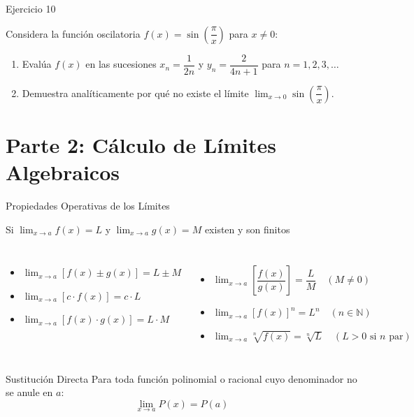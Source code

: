 \documentclass[aspectratio=169]{beamer}
\begin{document}
\begin{frame}{Ejercicio 10}
  \begin{mwejercicio}
    Considera la función oscilatoria $f(x) = \sin\left(\dfrac{\pi}{x}\right)$ para $x \neq 0$:
    \begin{enumerate}
      \item Evalúa $f(x)$ en las sucesiones $x_n = \dfrac{1}{2n}$ y $y_n = \dfrac{2}{4n + 1}$ para $n = 1, 2, 3, \dots$
      \item Demuestra analíticamente por qué no existe el límite $\lim_{x \to 0} \sin\left(\dfrac{\pi}{x}\right)$.
    \end{enumerate}
  \end{mwejercicio}
  \vspace{2.5cm}
\end{frame}


\section{Parte 2: Cálculo de Límites Algebraicos}


\begin{frame}{Propiedades Operativas de los Límites}
  \begin{block}{Si $\lim_{x \to a} f(x) = L$ y $\lim_{x \to a} g(x) = M$ existen y son finitos}
    \begin{columns}[T]
      \begin{itemize}
        \item $\lim_{x \to a} [f(x) \pm g(x)] = L \pm M$
        \item $\lim_{x \to a} [c \cdot f(x)] = c \cdot L$
        \item $\lim_{x \to a} [f(x) \cdot g(x)] = L \cdot M$
      \end{itemize}
      \begin{itemize}
        \item $\lim_{x \to a} \left[\dfrac{f(x)}{g(x)}\right] = \dfrac{L}{M} \quad (M \neq 0)$
        \item $\lim_{x \to a} [f(x)]^n = L^n \quad (n \in \mathbb{N})$
        \item $\lim_{x \to a} \sqrt[n]{f(x)} = \sqrt[n]{L} \quad (L > 0 \text{ si } n \text{ par})$
      \end{itemize}
    \end{columns}
  \end{block}

  \vspace{4pt}
  \begin{block}{Sustitución Directa}
    Para toda función polinomial o racional cuyo denominador no se anule en $a$:
    $$\lim_{x \to a} P(x) = P(a)$$
  \end{block}
\end{frame}
\end{document}
